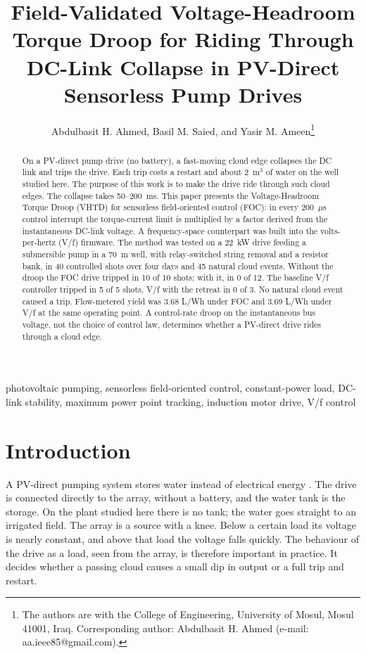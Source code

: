 \documentclass[journal]{IEEEtran}
\begin{document}
\title{Field-Validated Voltage-Headroom Torque Droop for Riding Through DC-Link Collapse in PV-Direct Sensorless Pump Drives}
\author{Abdulbasit H. Ahmed, Basil M. Saied, and Yasir M. Ameen\thanks{The authors are with the College of Engineering, University of Mosul, Mosul 41001, Iraq. Corresponding author: Abdulbasit H. Ahmed (e-mail: aa.ieee85@gmail.com).}}
\maketitle
\begin{abstract}
On a PV-direct pump drive (no battery), a fast-moving cloud edge collapses the DC link and trips the drive. Each trip costs a restart and about 2~m$^{3}$ of water on the well studied here. The purpose of this work is to make the drive ride through such cloud edges. The collapse takes 50--200~ms. This paper presents the Voltage-Headroom Torque Droop (VHTD) for sensorless field-oriented control (FOC): in every 200~$\mu$s control interrupt the torque-current limit is multiplied by a factor derived from the instantaneous DC-link voltage. A frequency-space counterpart was built into the volts-per-hertz (V/f) firmware. The method was tested on a 22~kW drive feeding a submersible pump in a 70~m well, with relay-switched string removal and a resistor bank, in 40 controlled shots over four days and 45 natural cloud events. Without the droop the FOC drive tripped in 10 of 10 shots; with it, in 0 of 12. The baseline V/f controller tripped in 5 of 5 shots, V/f with the retreat in 0 of 3. No natural cloud event caused a trip. Flow-metered yield was 3.68 L/Wh under FOC and 3.69 L/Wh under V/f at the same operating point. A control-rate droop on the instantaneous bus voltage, not the choice of control law, determines whether a PV-direct drive rides through a cloud edge.
\end{abstract}
\begin{IEEEkeywords}
photovoltaic pumping, sensorless field-oriented control, constant-power load, DC-link stability, maximum power point tracking, induction motor drive, V/f control
\end{IEEEkeywords}
\IEEEpeerreviewmaketitle
\section{Introduction}

A PV-direct pumping system stores water instead of electrical energy \cite{r1,r2}. The drive is connected directly to the array, without a battery, and the water tank is the storage. On the plant studied here there is no tank; the water goes straight to an irrigated field. The array is a source with a knee. Below a certain load its voltage is nearly constant, and above that load the voltage falls quickly. The behaviour of the drive as a load, seen from the array, is therefore important in practice. It decides whether a passing cloud causes a small dip in output or a full trip and restart.
\end{document}
